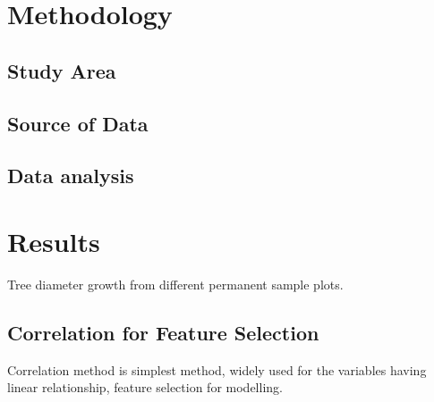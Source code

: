 \documentclass[
]{article}
\begin{document}
\newpage

\newpage
\fontsize{12}{18}
\tableofcontents

\newpage

\listoftables
\listoffigures

\newpage

\clearpage
{}
\fontsize{12}{18}

\hypertarget{methodology}{%
\section{Methodology}\label{methodology}}

\hypertarget{study-area}{%
\subsection{Study Area}\label{study-area}}

\hypertarget{source-of-data}{%
\subsection{Source of Data}\label{source-of-data}}

\hypertarget{data-analysis}{%
\subsection{Data analysis}\label{data-analysis}}

\hypertarget{results}{%
\section{Results}\label{results}}

Tree diameter growth from different permanent sample plots.

\hypertarget{correlation-for-feature-selection}{%
\subsection{Correlation for Feature
Selection}\label{correlation-for-feature-selection}}

Correlation method is simplest method, widely used for the variables
having linear relationship, feature selection for modelling.
\end{document}
